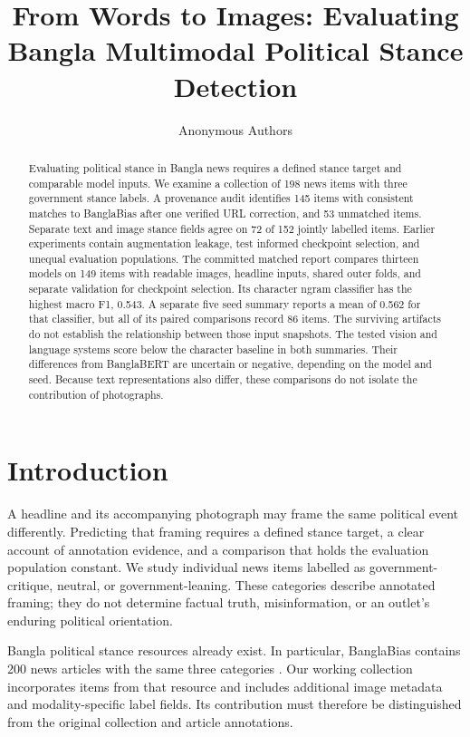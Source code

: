 \documentclass[11pt]{article}
\title{From Words to Images: Evaluating Bangla Multimodal Political Stance Detection}
\author{Anonymous Authors}
\begin{document}
\maketitle
\begin{abstract}
Evaluating political stance in Bangla news requires a defined stance target and comparable model inputs. We examine a collection of 198 news items with three government stance labels. A provenance audit identifies 145 items with consistent matches to BanglaBias after one verified URL correction, and 53 unmatched items. Separate text and image stance fields agree on 72 of 152 jointly labelled items. Earlier experiments contain augmentation leakage, test informed checkpoint selection, and unequal evaluation populations. The committed matched report compares thirteen models on 149 items with readable images, headline inputs, shared outer folds, and separate validation for checkpoint selection. Its character ngram classifier has the highest macro F1, 0.543. A separate five seed summary reports a mean of 0.562 for that classifier, but all of its paired comparisons record 86 items. The surviving artifacts do not establish the relationship between those input snapshots. The tested vision and language systems score below the character baseline in both summaries. Their differences from BanglaBERT are uncertain or negative, depending on the model and seed. Because text representations also differ, these comparisons do not isolate the contribution of photographs. %
\end{abstract}

\section{Introduction}
A headline and its accompanying photograph may frame the same political event differently. Predicting that framing requires a defined stance target, a clear account of annotation evidence, and a comparison that holds the evaluation population constant. We study individual news items labelled as government-critique, neutral, or government-leaning. These categories describe annotated framing; they do not determine factual truth, misinformation, or an outlet's enduring political orientation.

Bangla political stance resources already exist. In particular, BanglaBias contains 200 news articles with the same three categories \citep{lia2025read}. Our working collection incorporates items from that resource and includes additional image metadata and modality-specific label fields. Its contribution must therefore be distinguished from the original collection and article annotations.
\end{document}
